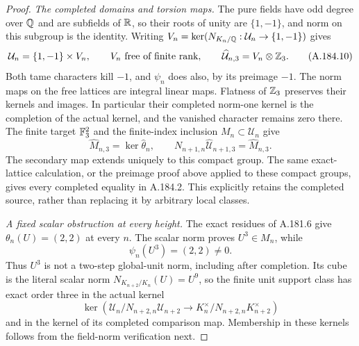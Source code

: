 \begin{proof}
\emph{The completed domains and torsion maps.}
The pure fields have odd degree over \(\mathbb Q\) and are
subfields of \(\mathbb R\), so their roots of unity are
\(\{1,-1\}\), and norm on this subgroup is the identity.
Writing
\(V_n=\ker(N_{K_n/\mathbb Q}:\mathcal U_n\to\{1,-1\})\)
gives
\[
 \mathcal U_n=\{1,-1\}\times V_n,
 \qquad V_n\text{ free of finite rank},\qquad
 \widehat{\mathcal U}_{n,3}=V_n\otimes\mathbb Z_3.
\tag{A.184.10}
\]
Both tame characters kill \(-1\), and \(\psi_n\) does
also, by its preimage \(-1\).  The norm maps on the free
lattices are integral linear maps.  Flatness of \(\mathbb Z_3\)
preserves their kernels and images.  In particular their
completed norm-one kernel is the completion of the actual
kernel, and the vanished character remains zero there.
The finite target \(\mathbb F_3^2\) and the finite-index inclusion
\(M_n\subset\mathcal U_n\) give
\[
 \widehat M_{n,3}=\ker\widehat\theta_n,
 \qquad
 N_{n+1,n}\widehat{\mathcal U}_{n+1,3}
                         =\widehat M_{n,3}.
\tag{A.184.11}
\]
The secondary map extends uniquely to this compact group.
The same exact-lattice calculation, or the preimage proof
above applied to these compact groups, gives every completed
equality in A.184.2.  This explicitly retains the completed
source, rather than replacing it by arbitrary local classes.

\emph{A fixed scalar obstruction at every height.}
The exact residues of A.181.6 give
\(\theta_n(U)=(2,2)\) at every \(n\).
The scalar norm proves \(U^3\in M_n\), while
\[
                  \psi_n(U^3)=(2,2)\ne0.
\tag{A.184.12}
\]
Thus \(U^3\) is not a two-step global-unit norm, including
after completion.  Its cube is the literal scalar norm
\(N_{K_{n+2}/K_n}(U)=U^9\), so the finite unit support
class has exact order three in the actual kernel
\[
 \ker\left(\mathcal U_n/N_{n+2,n}\mathcal U_{n+2}
       \longrightarrow K_n^\times/N_{n+2,n}K_{n+2}^\times\right)
\tag{A.184.13}
\]
and in the kernel of its completed comparison map.  Membership
in these kernels follows from the field-norm verification next.


\end{proof}
